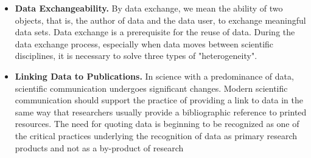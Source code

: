 \documentclass{vldb}
\begin{document}
\begin{itemize}
    \item \textbf{Data Exchangeability.} By data exchange, we mean the ability of two objects, that is, the author of data and the data user, to exchange meaningful data sets. Data exchange is a prerequisite for the reuse of data. During the data exchange process, especially when data moves between scientific disciplines, it is necessary to solve three types of "heterogeneity".
    \item \textbf{Linking Data to Publications.} In science with a predominance of data, scientific communication undergoes significant changes. Modern scientific communication should support the practice of providing a link to data in the same way that researchers usually provide a bibliographic reference to printed resources. The need for quoting data is beginning to be recognized as one of the critical practices underlying the recognition of data as primary research products and not as a by-product of research
\end{itemize}
\end{document}
